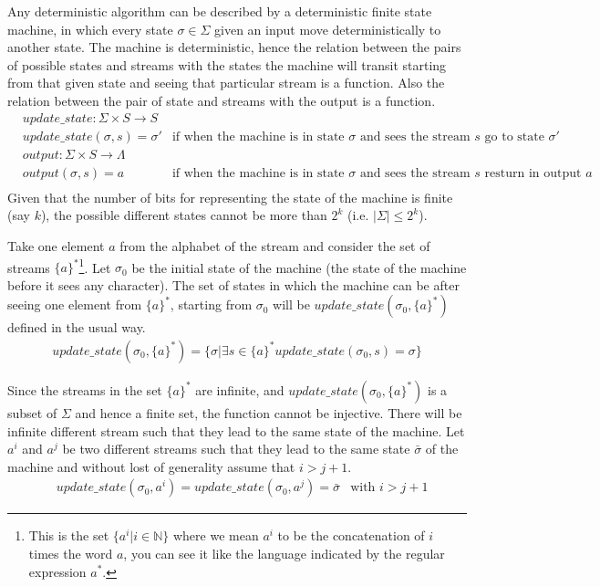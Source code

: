 \documentclass[a4paper]{article}
\begin{document}
Any deterministic algorithm can be described by a deterministic finite state machine, in which every state $\sigma \in \Sigma$ given an input move deterministically to another state.
The machine is deterministic, hence the relation between the pairs of possible states and streams with the states the machine will transit starting from that given state and seeing that particular stream is a function.
Also the relation between the pair of state and streams with the output is a function.
\begin{align*}
&update\_state : \Sigma \times S \longrightarrow S & \\
&update\_state(\sigma, s) = \sigma'  &\mbox{if when the machine is in state $\sigma$ and sees the stream $s$ go to state $\sigma'$} \\
&output : \Sigma \times S \longrightarrow \Lambda & \\
&output(\sigma, s) = a  &\mbox{if when the machine is in state $\sigma$ and sees the stream $s$ resturn in output $a$} \\
\end{align*}
Given that the number of bits for representing the state of the machine is finite (say $k$), the possible different states cannot be more than $2^k$ (i.e. $\vert \Sigma \vert \leq 2^k$).

Take one element $a$ from the alphabet of the stream and consider the set of streams $\{a\}^*$\footnote{This is the set $\{ a^i \vert i \in \mathbb{N} \}$ where we mean $a^i$ to be the concatenation of $i$ times the word $a$, you can see it like the language indicated by the regular expression $a^*$.}.
Let $\sigma_0$ be the initial state of the machine (the state of the machine before it sees any character).
The set of states in which the machine can be after seeing one element from $\{a\}^*$, starting from $\sigma_0$ will be $update\_state(\sigma_0, \{a\}^*)$ defined in the usual way.
\begin{align*}
update\_state(\sigma_0, \{a\}^*) = \{ \sigma \vert \exists s \in \{a\}^* update\_state(\sigma_0, s) = \sigma \}
\end{align*}

Since the streams in the set $\{a\}^*$ are infinite, and $update\_state(\sigma_0, \{a\}^*)$ is a subset of $\Sigma$ and hence a finite set, the function cannot be injective.
There will be infinite different stream such that they lead to the same state of the machine.
Let $a^i$ and $a^j$ be two different streams such that they lead to the same state $\bar{\sigma}$ of the machine and without lost of generality assume that $i > j + 1$.
\begin{align*}
&update\_state(\sigma_0, a^i) = update\_state(\sigma_0, a^j) = \bar{\sigma} &\mbox{with $i > j + 1$}
\end{align*}
\end{document}
